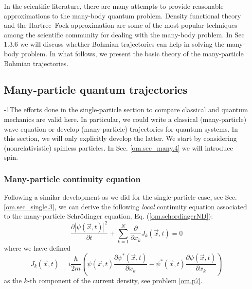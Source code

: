 \documentclass[onecolumn,nofootinbib, secnumarabic, amsmath, nobibnotes,11pt,aps,pra]{revtex4-1}
\newcommand{\sref}[1]{Sec. \ref{#1}}
\newcommand{\eref}[1]{Eq. (\ref{#1})}
\begin{document}
In the scientific literature, there are many attempts to provide
reasonable approximations to the many-body quantum problem. Density
functional theory \cite{om.kohn1964,om.kohn1965} and the
Hartree--Fock approximation \cite{om.Hartree,om.Hartree2,om.Fock} are
some of the most popular techniques among the scientific community
for dealing with the many-body problem. In Sec 1.3.6 we
will discuss whether Bohmian trajectories can help in solving the
many-body problem. In what follows, we present the basic theory of
the many-particle Bohmian trajectories.

\subsection{Many-particle quantum trajectories}\label{om.sec_many.2}

\looseness-1The efforts done in the single-particle section to compare classical
and quantum mechanics are valid here. In particular, we could write
a classical (many-particle) wave equation or develop (many-particle)
trajectories for quantum systems. In this section, we will only
explicitly develop the latter. We start by considering
(nonrelativistic) spinless particles. In \sref{om.sec_many.4} we
will introduce spin.

\subsubsection{Many-particle continuity equation}

Following a similar development as we did for the single-particle
case, see \sref{om.sec_single.3}, we can derive the following
\textit{local} continuity equation associated to the many-particle
Schr\"odinger equation, \eref{om.schordingerND}:
\begin{equation}
\label{om.continuityND}
 \frac{\partial |\psi(\vec{x},t)|^2} {\partial t} + \sum_{k = 1}^{N} \frac { \partial}  {\partial x_k}  J_k(\vec{x},t) = 0  
\end{equation}
where we have defined
\begin{equation}
\label{om.currentND}
J_k(\vec{x},t) = i \frac {\hbar} {2 m} \left(\psi(\vec{x},t) \frac {\partial \psi^{*}(\vec{x},t)} {\partial x_k}- \psi^{*}(\vec{x},t) \frac {\partial \psi(\vec{x},t)} {\partial x_k} \right)
\end{equation}
as the $k$-th component of the current density, see problem \ref{om.p7}.
\end{document}
